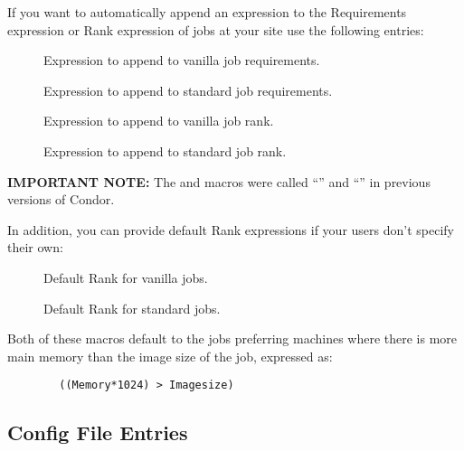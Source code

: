 If you want  to automatically append an expression to
the Requirements expression or Rank expression of jobs at your site
use the following entries:
\begin{description}
  
\item[] \label{param:AppendReqVanilla}
  Expression to append to vanilla job requirements.
  
\item[] \label{param:AppendReqStandard}
  Expression to append to standard job requirements.

\item[] \label{param:AppendRankStandard}
  Expression to append to vanilla job rank.

\item[] \label{param:AppendRankVanilla}
  Expression to append to standard job rank.

\end{description}

\textbf{IMPORTANT NOTE:} The  and 
 macros were called
``'' and
``'' in previous versions of Condor.

In addition, you can provide default Rank expressions if your users
don't specify their own:

\begin{description}

\item[] \label{param:DefaultRankVanilla}
  Default Rank for vanilla jobs.  

\item[] \label{param:DefaultRankStandard}
  Default Rank for standard jobs.

\end{description}

Both of these macros default to the jobs preferring machines where
there is more main memory than the image size of the job, expressed
as:
\begin{verbatim}
        ((Memory*1024) > Imagesize)
\end{verbatim}


\subsection{\label{sec:Preen-Config-File-Entries}
 Config File Entries}

